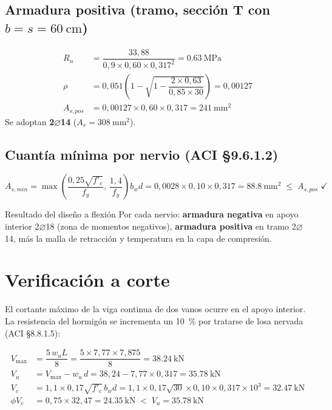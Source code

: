 \subsection{Armadura positiva (tramo, sección T con $b = s = \SI{60}{\centi\meter}$)}
\begin{align}
  R_n &= \dfrac{33{,}88}{0{,}9 \times 0{,}60 \times 0{,}317^2}
       = \SI{0,63}{\mega\pascal}\\
  \rho &= 0{,}051\left(1 - \sqrt{1 - \dfrac{2 \times 0{,}63}{0{,}85 \times 30}}\right)
       = 0{,}00127\\
  A_{s,pos} &= 0{,}00127 \times 0{,}60 \times 0{,}317 = \SI{241}{\milli\meter^2}
\end{align}
Se adoptan \textbf{2$\varnothing$14} ($A_s = \SI{308}{\milli\meter^2}$).

\subsection{Cuantía mínima por nervio (ACI \S9.6.1.2)}
\begin{equation}
  A_{s,min} = \max\!\left(\dfrac{0{,}25\sqrt{f'_c}}{f_y},\,
  \dfrac{1{,}4}{f_y}\right) b_w d
  = 0{,}0028 \times 0{,}10 \times 0{,}317 = \SI{88,8}{\milli\meter^2}
  \;\leq\; A_{s,pos}\;\checkmark
\end{equation}

\begin{clave}{Resultado del diseño a flexión}
Por cada nervio: \textbf{armadura negativa} en apoyo interior
2$\varnothing$18 (zona de momentos negativos), \textbf{armadura
positiva} en tramo 2$\varnothing$14, más la malla de retracción y
temperatura en la capa de compresión.
\end{clave}

\section{Verificación a corte}
\label{sec:corte}

El cortante máximo de la viga continua de dos vanos ocurre en el apoyo
interior. La resistencia del hormigón se incrementa un
\SI{10}{\percent} por tratarse de losa nervada (ACI \S8.8.1.5):

\begin{align}
  V_{\max} &= \dfrac{5\,w_u L}{8} = \dfrac{5 \times 7{,}77 \times 7{,}875}{8}
            = \SI{38,24}{\kilo\newton}\\
  V_u &= V_{\max} - w_u\,d = 38{,}24 - 7{,}77 \times 0{,}317
       = \SI{35,78}{\kilo\newton}\\
  V_c &= 1{,}1 \times 0{,}17\sqrt{f'_c}\,b_w d
       = 1{,}1 \times 0{,}17\sqrt{30} \times 0{,}10 \times 0{,}317 \times 10^3
       = \SI{32,47}{\kilo\newton}\\
  \phi V_c &= 0{,}75 \times 32{,}47 = \SI{24,35}{\kilo\newton}
  \;<\; V_u = \SI{35,78}{\kilo\newton}
\end{align}

